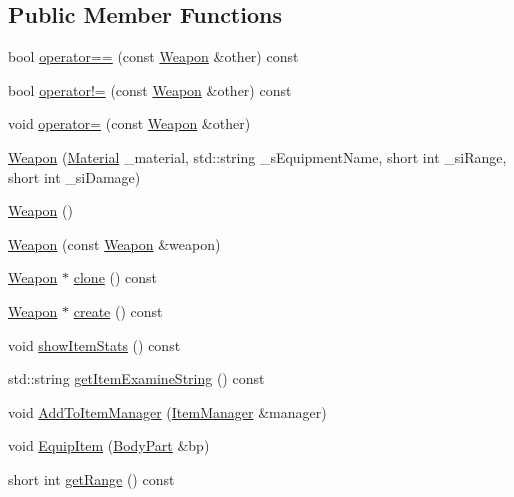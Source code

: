 \subsection*{Public Member Functions}
\begin{DoxyCompactItemize}
\item 
bool \mbox{\hyperlink{class_weapon_a775cb30927bd7d89b9666a1fd9f8ed5f}{operator==}} (const \mbox{\hyperlink{class_weapon}{Weapon}} \&other) const
\item 
bool \mbox{\hyperlink{class_weapon_a3e7097112f2e3e2eff39469af5d610d6}{operator!=}} (const \mbox{\hyperlink{class_weapon}{Weapon}} \&other) const
\item 
void \mbox{\hyperlink{class_weapon_a9a4297ad2057a660e2a7bd2c690f1ada}{operator=}} (const \mbox{\hyperlink{class_weapon}{Weapon}} \&other)
\item 
\mbox{\hyperlink{class_weapon_a832f6d4c8d48728aaf1fe0459bed0dbd}{Weapon}} (\mbox{\hyperlink{class_material}{Material}} \+\_\+material, std\+::string \+\_\+s\+Equipment\+Name, short int \+\_\+si\+Range, short int \+\_\+si\+Damage)
\item 
\mbox{\hyperlink{class_weapon_a42dbc46dd70319a24763992c4ebbd396}{Weapon}} ()
\item 
\mbox{\hyperlink{class_weapon_a167d8c34946b69123ddbb3ce7d739358}{Weapon}} (const \mbox{\hyperlink{class_weapon}{Weapon}} \&weapon)
\item 
\mbox{\hyperlink{class_weapon}{Weapon}} $\ast$ \mbox{\hyperlink{class_weapon_a4a914fa26d1d67a5d890252950f6b9be}{clone}} () const
\item 
\mbox{\hyperlink{class_weapon}{Weapon}} $\ast$ \mbox{\hyperlink{class_weapon_a0755dc1352391eb484644ab4e4cf144d}{create}} () const
\item 
void \mbox{\hyperlink{class_weapon_a5bd0118be0d84307c0865a63d907fec7}{show\+Item\+Stats}} () const
\item 
std\+::string \mbox{\hyperlink{class_weapon_aa52cecf0a3c34aba70a6425c36d40afa}{get\+Item\+Examine\+String}} () const
\item 
void \mbox{\hyperlink{class_weapon_a241a74219d47374ffebebaad675dc250}{Add\+To\+Item\+Manager}} (\mbox{\hyperlink{class_item_manager}{Item\+Manager}} \&manager)
\item 
void \mbox{\hyperlink{class_weapon_af7fda0b6e0d4ce8f25e2b0e4ad5fd94d}{Equip\+Item}} (\mbox{\hyperlink{class_body_part}{Body\+Part}} \&bp)
\item 
short int \mbox{\hyperlink{class_weapon_a726f5f0de9244b9e24e52407272cdf08}{get\+Range}} () const

\end{DoxyCompactItemize}
